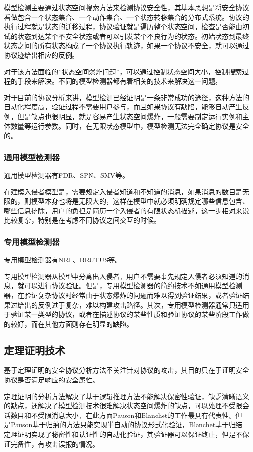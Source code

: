 \documentclass[cs4size,a4pape,UTF8]{ctexart}
\numberwithin{equation}{section}
\numberwithin{table}{section}
\numberwithin{figure}{section}
\begin{document}
模型检测主要通过状态空间搜索方法来检测协议安全性，其基本思想是将安全协议看做包含一个状态集合、一个动作集合、一个状态转移集合的分布式系统。协议的执行过程就是状态的迁移过程，协议验证就是遍历整个状态空间，检查是否能由初试的状态到达某个不安全状态或者可以引发某个不良行为的状态。初始状态到最终状态之间的所有状态构成了一个协议执行轨迹，如果一个协议不安全，就可以通过协议迹给出相应的反例。

对于该方法面临的''状态空间爆炸问题''，可以通过控制状态空间大小，控制搜索过程的手段来解决。不同的模型检测器都有着相关的技术来解决这一问题。

对于目前的协议分析来讲，模型检测已经证明是一条非常成功的途径，这种方法的自动化程度高，验证过程不需要用户参与，而且如果协议有缺陷，能够自动产生反例，但是缺点也很明显，就是容易产生状态空间爆炸，一般需要制定运行实例和主体数量等运行参数。同时，在无限状态模型中，模型检测无法完全确定协议是安全的\cite{1}。

\subsubsection{通用模型检测器}
通用模型检测器有FDR、SPN、SMV等。

在建模入侵者模型是，需要规定入侵者知道和不知道的消息，如果消息的数目是无限的，则模型本身也将是无限大的，这样在模型中就必须明确规定哪些信息包含、哪些信息排除，用户的负担是简历一个入侵者的有限状态机描述，这一步相对来说比较复杂，特别是在考虑不同协议之间交互的时候\cite{3}。

\subsubsection{专用模型检测器}
专用模型检测器有NRL、BRUTUS等。

专用模型检测器从模型中分离出入侵者，用户不需要事先规定入侵者必须知道的消息，就可以进行协议验证。但是，专用模型检测器的简约技术不如通用模型检测器，在验证复杂协议时经常由于状态爆炸的问题而难以得到验证结果，或者验证结果过给出的反例过于复杂，难以构建攻击路径。其次，专用模型检测器通常只适用于验证某一类型的协议，或者在描述协议的某些性质和验证协议的某些阶段工作做的较好，而在其他方面则存在明显的缺陷\cite{3}。


\subsection{定理证明技术}
基于定理证明的安全协议分析方法不关注针对协议的攻击，其目的只在于证明安全协议是否满足响应的安全属性。

定理证明的分析方法解决了基于逻辑推理方法不能解决保密性验证，缺乏清晰语义的缺点，还解决了模型检测技术很难解决状态空间爆炸的缺点，可以处理不受限会话数目和不受限消息大小，在此方面Pauson和Blanchet的工作最具有代表性。但是Pauson基于归纳的方法只能实现半自动的协议形式化验证，Blanchet基于归结定理证明实现了秘密性和认证性的自动化验证，其验证器可以保证终止，但是不保证完备性，有攻击误报的情况\cite{6}。
\end{document}
